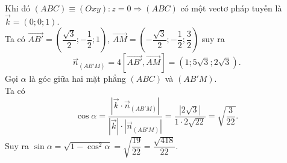 \begin{ex}
{		Khi đó $(ABC) \equiv(Oxy)\colon z=0 \Rightarrow(ABC)$ có một vectơ pháp tuyến là $\vec{k}=(0;0;1)$.\\
		Ta có $\overrightarrow{AB'}=\left(\dfrac{\sqrt{3}}{2} ;-\dfrac{1}{2};1\right)$, $\overrightarrow{AM}=\left(-\dfrac{\sqrt{3}}{2};-\dfrac{1}{2};\dfrac{3}{2}\right)$ suy ra $$\overrightarrow{n}_{\left(AB'M\right)}=4\left[\overrightarrow{AB'},\overrightarrow{AM}\right]=\left(1;5\sqrt{3};2\sqrt{3}\right).$$
		Gọi $\alpha$ là góc giữa hai mặt phẳng $(ABC)$ và $(AB'M)$.\\
		Ta có $$\cos \alpha=\dfrac{\left|\vec{k}\cdot \vec{n}_{\left(AB'M\right)}\right|}{|\vec{k}| \cdot\left|\overrightarrow{n}_{\left(AB'M\right)}\right|}=\dfrac{|2 \sqrt{3}|}{1\cdot 2 \sqrt{22}}=\sqrt{\dfrac{3}{22}}.$$
		Suy ra $\sin \alpha=\sqrt{1-\cos ^2 \alpha}=\sqrt{\dfrac{19}{22}}=\dfrac{\sqrt{418}}{22}$.
	}
\end{ex}


